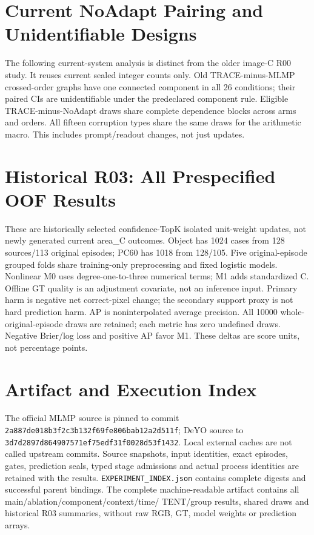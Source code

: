 \documentclass[10pt,twocolumn]{article}
\begin{document}
\section{Current NoAdapt Pairing and Unidentifiable Designs}
The following current-system analysis is distinct from the older image-C
R00 study. It reuses current sealed integer counts only. Old TRACE-minus-MLMP
crossed-order graphs have one connected component in all 26 conditions;
their paired CIs are unidentifiable under the predeclared component rule.
Eligible TRACE-minus-NoAdapt draws share complete dependence blocks across
arms and orders. All fifteen corruption types share the same draws for the
arithmetic macro. This includes prompt/readout changes, not just updates.

\FloatBarrier\clearpage

\section{Historical R03: All Prespecified OOF Results}
These are historically selected confidence-TopK isolated unit-weight updates,
not newly generated current area\_C outcomes. Object has 1024 cases from
128 sources/113 original episodes; PC60 has 1018 from 128/105. Five
original-episode grouped folds share training-only preprocessing and fixed
logistic models. Nonlinear M0 uses degree-one-to-three numerical terms;
M1 adds standardized C. Offline GT quality is an adjustment covariate, not
an inference input. Primary harm is negative net correct-pixel change;
the secondary support proxy is not hard prediction harm. AP is
noninterpolated average precision. All 10000 whole-original-episode draws
are retained; each metric has zero undefined draws. Negative Brier/log loss
and positive AP favor M1. These deltas are score units, not percentage points.



\FloatBarrier\clearpage

\section{Artifact and Execution Index}
The official MLMP source is pinned to commit
\texttt{2a887de018b3f2c3b132f69fe806bab12a2d511f}; DeYO source to
\texttt{3d7d2897d864907571ef75edf31f0028d53f1432}. Local external caches are
not called upstream commits. Source snapshots, input identities, exact
episodes, gates, prediction seals, typed stage admissions and actual process
identities are retained with the results. \texttt{EXPERIMENT\_INDEX.json}
contains complete digests and successful parent bindings. The complete
machine-readable artifact contains all main/ablation/component/context/time/
TENT/group results, shared draws and historical R03 summaries, without raw
RGB, GT, model weights or prediction arrays.
\end{document}
